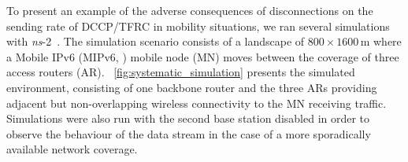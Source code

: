 \documentclass[twocolumn]{nictatechreport}
\newcommand{\ns}{\textit{ns}}
\begin{document}
To present an example of the adverse consequences of disconnections on the
sending rate of DCCP/TFRC in mobility situations, we ran several simulations
with \ns-2~\cite{2009vint_ns_manual}.  The simulation scenario consists of a
landscape of $800\times1600$\,m where a Mobile IPv6 (MIPv6, \cite{rfc3775})
mobile node (MN) moves between the coverage of three access routers (AR).
\figurename~\ref{fig:systematic_simulation} presents the simulated environment,
consisting of one backbone router and the three ARs providing adjacent but
non-overlapping wireless connectivity to the MN receiving traffic.  Simulations
were also run with the second base station disabled in order to observe the
behaviour of the data stream in the case of a more sporadically available
network coverage. 

\begin{figure}[tb]
  \centering 
\end{figure}
\end{document}
